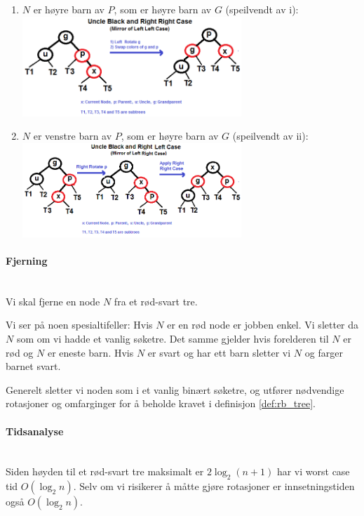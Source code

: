 \begin{teorem}
\begin{enumerate}
\begin{enumerate}
\begin{enumerate}
			\item $ N $ er høyre barn av $ P $, som er høyre barn av $ G $ (speilvendt av i):\\
			\includegraphics[width=0.65\textwidth]{rbt_rr.png}\\
			
			\item $ N $ er venstre barn av $ P $, som er høyre barn av $ G $ (speilvendt av ii):\\
			\includegraphics[width=0.65\textwidth]{rbt_rl.png}\\
			
		\end{enumerate}
	\end{enumerate}
\end{enumerate}
\end{teorem}


\paragraph{Fjerning}~\\
Vi skal fjerne en node $ N $ fra et rød-svart tre.

Vi ser på noen spesialtifeller: Hvis $ N $ er en rød node er jobben enkel. Vi sletter da $ N $ som om vi hadde et vanlig søketre. Det samme gjelder hvis forelderen til $ N $ er rød og $ N $ er eneste barn. Hvis $ N $ er svart og har ett barn sletter vi $ N $ og farger barnet svart. 

Generelt sletter vi noden som i et vanlig binært søketre, og utfører nødvendige rotasjoner og omfarginger for å beholde kravet i definisjon \ref{def:rb_tree}.


\paragraph{Tidsanalyse}~\\
Siden høyden til et rød-svart tre maksimalt er $ 2\log_2 (n+1) $ har vi worst case tid $ O(\log_2 n) $. Selv om vi risikerer å måtte gjøre rotasjoner er innsetningstiden også $ O(\log_2 n) $.



